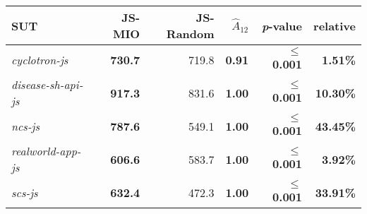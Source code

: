 \begin{tabular}{ l r r r r r }\\ 
\toprule 
SUT &  JS-MIO & JS-Random & $\hat{A}_{12}$ & \emph{p}-value  & relative \\ 
\midrule 
\emph{cyclotron-js} & \textbf{730.7} & 719.8 & \textbf{0.91} & \textbf{$\le $0.001} & \textbf{1.51\%} \\ 
\emph{disease-sh-api-js} & \textbf{917.3} & 831.6 & \textbf{1.00} & \textbf{$\le $0.001} & \textbf{10.30\%} \\ 
\emph{ncs-js} & \textbf{787.6} & 549.1 & \textbf{1.00} & \textbf{$\le $0.001} & \textbf{43.45\%} \\ 
\emph{realworld-app-js} & \textbf{606.6} & 583.7 & \textbf{1.00} & \textbf{$\le $0.001} & \textbf{3.92\%} \\ 
\emph{scs-js} & \textbf{632.4} & 472.3 & \textbf{1.00} & \textbf{$\le $0.001} & \textbf{33.91\%} \\ 
\bottomrule 
\end{tabular} 
